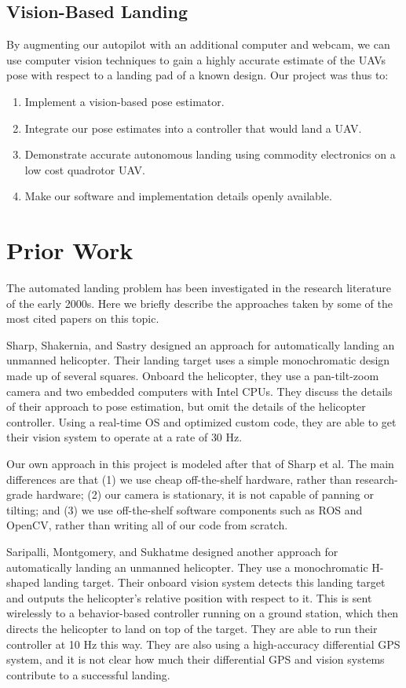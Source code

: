 \documentclass[10pt]{scrartcl} %
\begin{document}
\subsection{Vision-Based Landing}
By augmenting our autopilot with an additional computer and webcam, we can use computer vision techniques to gain a highly accurate estimate of the UAVs pose with respect to a landing pad of a known design.
Our project was thus to:
\begin{enumerate}
\item{Implement a vision-based pose estimator.}
\item{Integrate our pose estimates into a controller that would land a UAV.}
\item{Demonstrate accurate autonomous landing using commodity electronics on a low cost quadrotor UAV.}
\item{Make our software and implementation details openly available.}
\end{enumerate}

\section{Prior Work}

The automated landing problem has been investigated in the research literature
of the early 2000s. Here we briefly describe the approaches taken by some of
the most cited papers on this topic.

Sharp, Shakernia, and Sastry \cite{sharp_et_al_2001} designed an approach for
automatically landing an unmanned helicopter. Their landing target uses a
simple monochromatic design made up of several squares. Onboard the helicopter,
they use a pan-tilt-zoom camera and two embedded computers with Intel CPUs.
They discuss the details of their approach to pose estimation, but omit the
details of the helicopter controller. Using a real-time OS and optimized custom
code, they are able to get their vision system to operate at a rate of 30 Hz.

Our own approach in this project is modeled after that of Sharp et al. The main
differences are that (1) we use cheap off-the-shelf hardware, rather than
research-grade hardware; (2) our camera is stationary, it is not capable of
panning or tilting; and (3) we use off-the-shelf software components such as
ROS and OpenCV, rather than writing all of our code from scratch.

Saripalli, Montgomery, and Sukhatme \cite{saripalli_et_al_2002} designed
another approach for automatically landing an unmanned helicopter. They use a
monochromatic H-shaped landing target. Their onboard vision system detects this
landing target and outputs the helicopter's relative position with respect to
it. This is sent wirelessly to a behavior-based controller running on a ground
station, which then directs the helicopter to land on top of the target. They
are able to run their controller at 10 Hz this way. They are also using a
high-accuracy differential GPS system, and it is not clear how much their
differential GPS and vision systems contribute to a successful landing.
\end{document}
